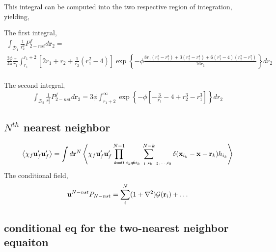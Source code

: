 This integral can be computed into the two respective region of integration, yielding, 

The first integral, 
\begin{multline}
    \int_{
        \mathcal{D}_1 
    }
    \frac{1}{r_2^2}P_{2-nst}^f
    d\textbf{r}_2 
    =\\
    \frac{3 \phi}{4\pi}
    \frac{\pi}{r_1}
    \int_{r_1}^{r_1+2}
    [2r_1
    + 
        r_2
        +     
        \frac{1}{r_2}
        (r_1^2 - 4)]
    \exp\left\{-\phi 
    \frac{ 
    8 r_{1} \left(r_{2}^{3} - r_{1}^{3}\right) 
   + 3 (r_{2}^{4} - r_{1}^{4})
   + 6  \left(r_{1}^{2} - 4 \right) \left(r_{2}^{2} - r_{1}^{2}\right)}{16 r_{1}}
    \right\} 
    dr_2\\
\end{multline}

The second integral, 
\begin{multline}
    \int_{
        \mathcal{D}_2 
    }
    \frac{1}{r_2^2}P_{2-nst}^f
    d\textbf{r}_2 
    =
    3 \phi
    \int_{r_1+2}^{\infty}
    \exp\left\{-\phi 
    \left[
        -\frac{3}{r_1}
        - 4 
        + r_2^3
        -r_1^3
    \right]
    \right\} 
    dr_2 
\end{multline}



\subsection*{$N^{th}$ nearest neighbor}

\begin{equation}
    \left<
        \chi_f \textbf{u}_f' \textbf{u}_f'
    \right>
    =
    \int d \textbf{r}^N \left<
        \chi_f \textbf{u}_f' \textbf{u}_f'
        \prod_{k=0}^{N-1} \sum_{i_k \neq i_{k-1},i_{k-2},\ldots, i_0}^{N-k}
        \delta(\textbf{x}_{i_k} - \textbf{x} - \textbf{r}_k)
        h_{i_k}
    \right>
\end{equation}
The conditional field, 
\begin{equation}
    \textbf{u}^{N-nst} P_{N-nst}
    = 
    \sum_i^N (1+\mathbf{\nabla}^2) \mathcal{G}(\textbf{r}_i)+\ldots
\end{equation}



\subsection*{conditional eq for the two-nearest neighbor equaiton}


